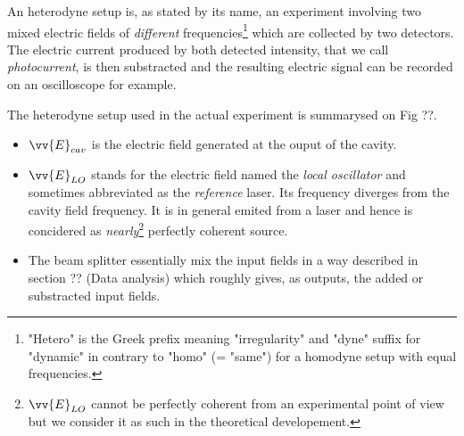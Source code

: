 \documentclass[12pt]{report}
\begin{document}
An heterodyne setup is, as stated by its name, an experiment involving two mixed electric fields of \textit{different} frequencies\footnote{"Hetero" is the Greek prefix meaning "irregularity" and "dyne" suffix for "dynamic" in contrary to "homo" (= "same") for a homodyne setup with equal frequencies.} which are collected by two detectors. The electric current produced by both detected intensity, that we call \textit{photocurrent}, is then substracted and the resulting electric signal can be recorded on an oscilloscope for example. 

The heterodyne setup used in the actual experiment is summarysed on Fig ??.
\begin{itemize}
 \item $\vv{E}_{cav}$ is the electric field generated at the ouput of the cavity.
 \item $\vv{E}_{LO}$ stands for the electric field named the \textit{local oscillator} and sometimes abbreviated as the \textit{reference} laser. Its frequency diverges from the cavity field frequency. It is in general emited from a laser and hence is concidered as \textit{nearly}\footnote{$\vv{E}_{LO}$ cannot be perfectly coherent from an experimental point of view but we consider it as such in the theoretical developement.} perfectly coherent source.
 \item The beam splitter essentially mix the input fields in a way described in section ?? (Data analysis) which roughly gives, as outputs, the added or substracted input fields.
\end{itemize}
\end{document}
